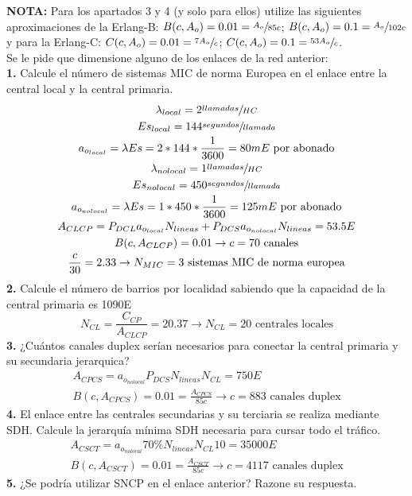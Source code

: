 \begin{exercise}[11]
\begin{itemize}
\end{itemize}
\textbf{NOTA:} Para los apartados 3 y 4 (y solo para ellos) utilize las siguientes aproximaciones de la Erlang-B: $B(c,A_o)=0.01=\sfrac{A_o}{85c}$; $B(c,A_o)=0.1=\sfrac{A_o}{102c}$ y para la Erlang-C: $C(c,A_o)=0.01=\sfrac{7A_o}{c}$; $C(c,A_o)=0.1=\sfrac{53A_o}{c}$.\\
Se le pide que dimensione alguno de los enlaces de la red anterior:\\
\textbf{1.} Calcule el número de sistemas MIC de norma Europea en el enlace entre la central local y la central primaria.\\
\begin{gather*}
\lambda_{local}=2\sfrac{llamadas}{HC}\\
E{s}_{local}=144\sfrac{segundos}{llamada}\\
a_{o_{local}}=\lambda E{s}=2*144*\frac{1}{3600}=80mE\text{ por abonado}\\
\lambda_{nolocal}=1\sfrac{llamadas}{HC}\\
E{s}_{nolocal}=450\sfrac{segundos}{llamada}\\
a_{o_{nolocal}}=\lambda E{s}=1*450*\frac{1}{3600}=125mE\text{ por abonado}\\
A_{CLCP}=P_{DCL}a_{o_{local}}N_{lineas}+P_{DCS}a_{o_{nolocal}}N_{lineas}=53.5E\\
B(c,A_{CLCP})=0.01 \to c=70\text{ canales}\\
\frac{c}{30}=2.33 \to N_{MIC}=3\text{ sistemas MIC de norma europea}
\end{gather*}
\textbf{2.} Calcule el número de barrios por localidad sabiendo que la capacidad de la central primaria es 1090E\\
\[N_{CL}=\frac{C_{CP}}{A_{CLCP}}=20.37\to N_{CL}=20 \text{ centrales locales}\]
\textbf{3.} ¿Cuántos canales duplex serían necesarios para conectar la central primaria y su secundaria jerarquica?\\
\begin{gather*}
A_{CPCS}=a_{o_{nolocal}}P_{DCS}N_{lineas}N_{CL}=750E\\
B(c,A_{CPCS})=0.01=\frac{A_{CPCS}}{85c}\to c=883\text{ canales duplex}
\end{gather*}
\textbf{4.} El enlace entre las centrales secundarias y su terciaria se realiza mediante SDH. Calcule la jerarquía mínima SDH  necesaria para cursar todo el tráfico.\\
\begin{gather*}
A_{CSCT}=a_{o_{nolocal}}70\%N_{lineas}N_{CL}10=35000E\\
B(c,A_{CSCT})=0.01=\frac{A_{CSCT}}{85c}\to c=4117\text{ canales duplex}
\end{gather*}
\textbf{5.} ¿Se podría utilizar SNCP en el enlace anterior? Razone su respuesta.
\end{exercise}